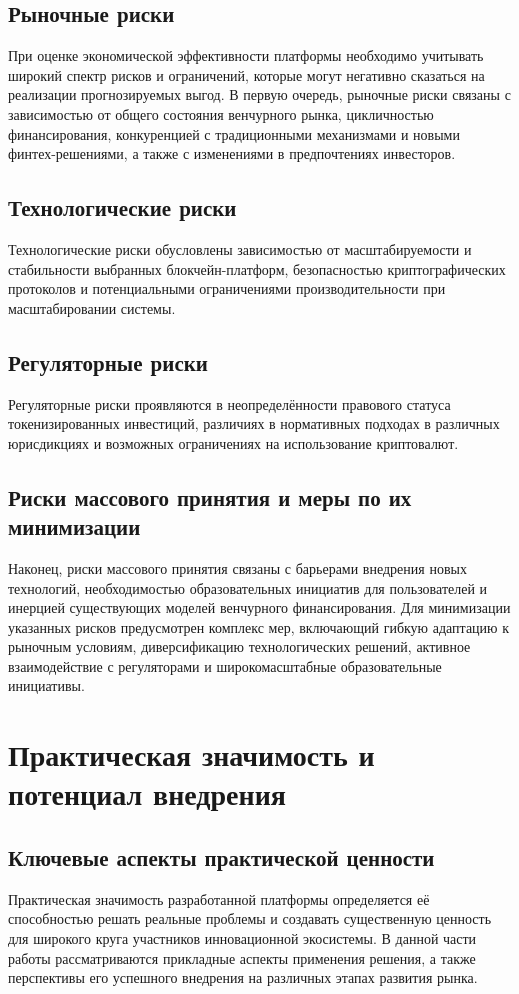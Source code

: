 \documentclass[
    candidate, %
    subf, %
    dotsinheaders=false,
]{disser}
\begin{document}
\subsection{Рыночные риски}
При оценке экономической эффективности платформы необходимо учитывать широкий спектр рисков и ограничений, которые могут негативно сказаться на реализации прогнозируемых выгод. В первую очередь, рыночные риски связаны с зависимостью от общего состояния венчурного рынка, цикличностью финансирования, конкуренцией с традиционными механизмами и новыми финтех-решениями, а также с изменениями в предпочтениях инвесторов.

\subsection{Технологические риски}
Технологические риски обусловлены зависимостью от масштабируемости и стабильности выбранных блокчейн-платформ, безопасностью криптографических протоколов и потенциальными ограничениями производительности при масштабировании системы.

\subsection{Регуляторные риски}
Регуляторные риски проявляются в неопределённости правового статуса токенизированных инвестиций, различиях в нормативных подходах в различных юрисдикциях и возможных ограничениях на использование криптовалют.

\subsection{Риски массового принятия и меры по их минимизации}
Наконец, риски массового принятия связаны с барьерами внедрения новых технологий, необходимостью образовательных инициатив для пользователей и инерцией существующих моделей венчурного финансирования. Для минимизации указанных рисков предусмотрен комплекс мер, включающий гибкую адаптацию к рыночным условиям, диверсификацию технологических решений, активное взаимодействие с регуляторами и широкомасштабные образовательные инициативы.

\section{Практическая значимость и потенциал внедрения}

\subsection{Ключевые аспекты практической ценности}
Практическая значимость разработанной платформы определяется её способностью решать реальные проблемы и создавать существенную ценность для широкого круга участников инновационной экосистемы. В данной части работы рассматриваются прикладные аспекты применения решения, а также перспективы его успешного внедрения на различных этапах развития рынка.
\end{document}

